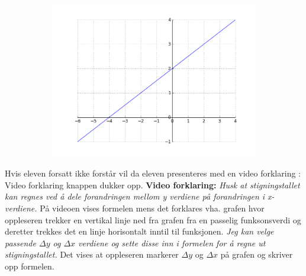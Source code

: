 \documentclass[12pt,twoside,onecolumn]{article}
\begin{document}
\begin{Exercise}
\begin{figure}[h!]
\begin{subfigure}{.5\textwidth}
    \includegraphics[scale = 0.5]{figures/05Xp2.png}
    \end{subfigure}
\end{figure}
{\color{Maroon}Hvis eleven forsatt ikke forstår vil da eleven presenteres med en video forklaring :  Video forklaring knappen dukker opp.}
\newline
\newline
\textbf{Video forklaring:}
\newline\newline
{\emph{\color{gray}
Husk at stigningstallet kan regnes ved å dele forandringen mellom y verdiene på forandringen i x-verdiene.}} 
\newline
{\color{PineGreen} På videoen vises formelen mens det forklares vha. grafen hvor oppleseren trekker en vertikal linje ned fra grafen fra en passelig funksonsverdi og deretter trekkes det en linje horisontalt inntil til funksjonen.} \newline\newline
{\emph{\color{gray}
Jeg kan velge passende $\Delta y$ og $\Delta x$ verdiene og sette disse inn i formelen for å regne ut stigningstallet.}} \newline
{\color{PineGreen} Det vises at oppleseren markerer $\Delta y$ og $\Delta x$ på grafen og skriver opp formelen.} 
\begin{figure}[h!]
\centering

\end{figure}
\end{Exercise}
\end{document}
